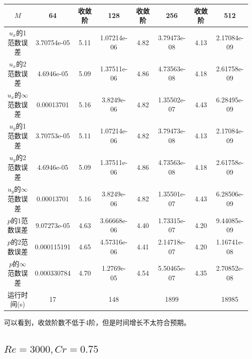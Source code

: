 \documentclass[lang=cn,10pt,bibend=bibtex]{elegantbook}
\begin{document}
\begin{table}[H]
  \centering
  \small
  \begin{tabular}{c|ccccccc}
  \textbf{$M$}              & 64          & 收敛阶 & 128         & 收敛阶 & 256         & 收敛阶 & 512   \\ \hline
  $u_x$的1范数误差 & 3.70754e-05 & 5.11 & 1.07214e-06 & 4.82 & 3.79473e-08 & 4.13 & 2.17084e-09\\
  $u_x$的2范数误差 & 4.6946e-05 & 5.09 & 1.37511e-06 & 4.86 & 4.73563e-08 & 4.18 & 2.61758e-09\\
  $u_x$的$\infty$范数误差 & 0.00013701 & 5.16 & 3.8249e-06 & 4.82 & 1.35502e-07 & 4.43 & 6.28495e-09\\
  $u_y$的1范数误差 & 3.70753e-05 & 5.11 & 1.07214e-06 & 4.82 & 3.79473e-08 & 4.13 & 2.17084e-09\\
  $u_y$的2范数误差 & 4.6946e-05 & 5.09 & 1.37511e-06 & 4.86 & 4.73563e-08 & 4.18 & 2.61758e-09\\
  $u_y$的$\infty$范数误差 & 0.00013701 & 5.16 & 3.8249e-06 & 4.82 & 1.35501e-07 & 4.43 & 6.28506e-09\\
  $p$的1范数误差 & 9.07273e-05 & 4.63 & 3.66668e-06 & 4.40 & 1.73315e-07 & 4.20 & 9.44085e-09\\
  $p$的2范数误差 & 0.000115191 & 4.65 & 4.57316e-06 & 4.41 & 2.14718e-07 & 4.20 & 1.16741e-08\\
  $p$的$\infty$范数误差 & 0.000330784 & 4.70 & 1.2769e-05 & 4.54 & 5.50465e-07 & 4.35 & 2.70852e-08\\  
  运行时间(s)                &      17      &       &     148      &       &     1899     &       &  18985
  \end{tabular}
\end{table}

可以看到，收敛阶数不低于4阶，但是时间增长不太符合预期。

\subsection{$Re=3000,Cr=0.75$}
\end{document}
